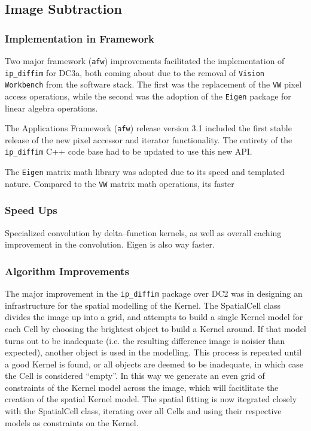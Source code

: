 
\subsection{Image Subtraction}

\subsubsection{Implementation in Framework}

Two major framework ({\tt afw}) improvements facilitated the
implementation of {\tt ip\_diffim} for DC3a, both coming about due to
the removal of {\tt Vision Workbench} from the software stack.  The
first was the replacement of the {\tt VW} pixel access operations,
while the second was the adoption of the {\tt Eigen} package for
linear algebra operations.  

The Applications Framework ({\tt afw}) release version 3.1 included the first stable
release of the new pixel accessor and iterator functionality.  The entirety of the  {\tt ip\_diffim} 
C++ code base had to be updated to use this new API.  

The {\tt Eigen} matrix math library was adopted due to its speed and templated nature.  Compared to the {\tt VW} matrix
math operations, its faster



\subsubsection{Speed Ups}

Specialized convolution by delta--function kernels, as well as overall caching improvement in the convolution.  Eigen
is also way faster.

\subsubsection{Algorithm Improvements}

The major improvement in the {\tt ip_diffim} package over DC2 was in designing an infrastructure for
the spatial modelling of the Kernel.  The SpatialCell class divides the image up into a grid, and attempts
to build a single Kernel model for each Cell by choosing the brightest object to build a Kernel around.  
If that model turns out to be inadequate (i.e. the resulting difference image is noisier than expected), 
another object is used in the modelling.  This process is repeated until a good Kernel is found, or all objects are 
deemed to be inadequate, in which case the Cell is considered ``empty''.  In this way we generate
an even grid of constraints of the Kernel model across the image, which will facitlitate the creation of the spatial Kernel model.
The spatial fitting is now itegrated closely with the SpatialCell class, iterating over all Cells and using their respective
models as constraints on the Kernel.  


